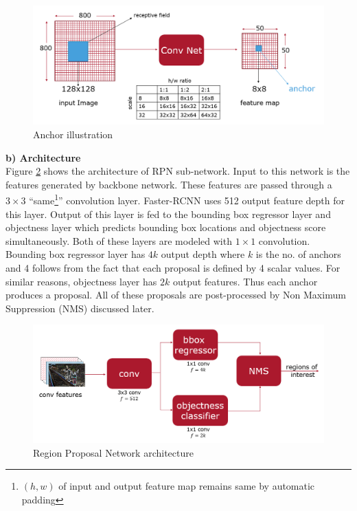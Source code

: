 \begin{figure}
    \centering
    \includegraphics[width=\linewidth]{images/anchors.PNG}
    \caption[Anchor illustration]{Anchor illustration}
    \label{fig:anchors}
\end{figure}

\textbf{b) Architecture} \\
Figure \ref{fig:RPN-architecture} shows the architecture of RPN sub-network. Input to this network is the features generated by backbone network. These features are passed through a $3\times3$ ``same\footnote{$(h,w)$ of input and output feature map remains same by automatic padding}'' convolution layer. Faster-RCNN uses 512 output feature depth for this layer. Output of this layer is fed to the bounding box regressor layer and objectness layer which predicts bounding box locations and objectness score simultaneously. Both of these layers are modeled with $1\times1$ convolution. Bounding box regressor layer has $4k$ output depth where $k$ is the no. of anchors and 4 follows from the fact that each proposal is defined by 4 scalar values. For similar reasons, objectness layer has $2k$ output features. Thus each anchor produces a proposal. All of these proposals are post-processed by Non Maximum Suppression (NMS) discussed later. 

\begin{figure}
    \centering
    \includegraphics[width=\linewidth]{images/RPN-architecture.PNG}
    \caption[RPN architecture]{Region Proposal Network architecture}
    \label{fig:RPN-architecture}
\end{figure}

